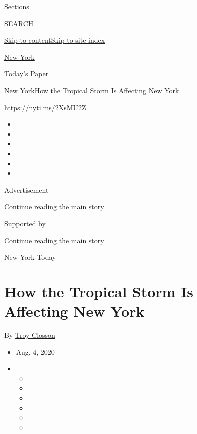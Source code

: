 Sections

SEARCH

\protect\hyperlink{site-content}{Skip to
content}\protect\hyperlink{site-index}{Skip to site index}

\href{https://www.nytimes3xbfgragh.onion/section/nyregion}{New York}

\href{https://myaccount.nytimes3xbfgragh.onion/auth/login?response_type=cookie\&client_id=vi}{}

\href{https://www.nytimes3xbfgragh.onion/section/todayspaper}{Today's
Paper}

\href{/section/nyregion}{New York}\textbar{}How the Tropical Storm Is
Affecting New York

\url{https://nyti.ms/2XsMU2Z}

\begin{itemize}
\item
\item
\item
\item
\item
\item
\end{itemize}

Advertisement

\protect\hyperlink{after-top}{Continue reading the main story}

Supported by

\protect\hyperlink{after-sponsor}{Continue reading the main story}

New York Today

\hypertarget{how-the-tropical-storm-is-affecting-new-york}{%
\section{How the Tropical Storm Is Affecting New
York}\label{how-the-tropical-storm-is-affecting-new-york}}

By \href{https://www.nytimes3xbfgragh.onion/by/troy-closson}{Troy
Closson}

\begin{itemize}
\item
  Aug. 4, 2020
\item
  \begin{itemize}
  \item
  \item
  \item
  \item
  \item
  \item
  \end{itemize}
\end{itemize}

